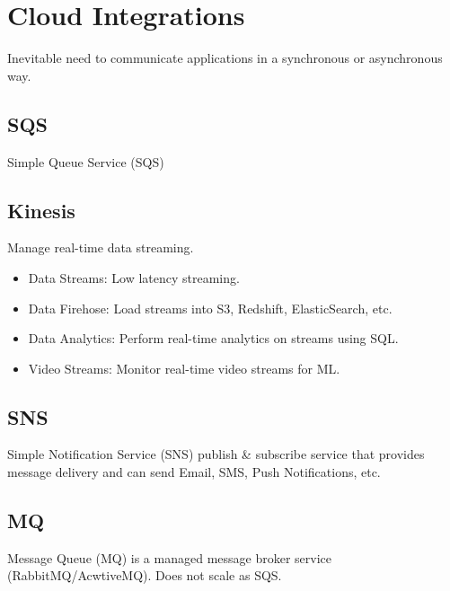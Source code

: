 \section{Cloud Integrations}\label{sec:cloud-integrations}
Inevitable need to communicate applications in a synchronous or asynchronous way.

\subsection{SQS}\label{subsec:sqs}
Simple Queue Service (SQS)

\subsection{Kinesis}\label{subsec:kinesis}
Manage real-time data streaming.

\begin{itemize}
    \item{Data Streams:} Low latency streaming.
    \item{Data Firehose:} Load streams into S3, Redshift, ElasticSearch, etc.
    \item{Data Analytics:} Perform real-time analytics on streams using SQL\@.
    \item{Video Streams:} Monitor real-time video streams for ML\@.
\end{itemize}

\subsection{SNS}\label{subsec:sns}
Simple Notification Service (SNS) publish \& subscribe service that provides message delivery and
can send Email, SMS, Push Notifications, etc.

\subsection{MQ}\label{subsec:mq}
Message Queue (MQ) is a managed message broker service (RabbitMQ/AcwtiveMQ).
Does not scale as SQS\@.


